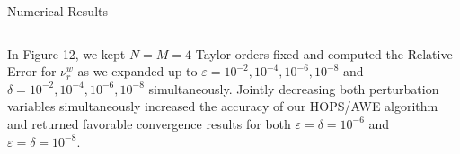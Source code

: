 \begin{section}{Numerical Results}
\begin{longtable}[c]{llllll}
\end{longtable}
\vspace{-2mm}
\hspace{-6mm}In Figure 12, we kept  $N=M=4$ Taylor orders fixed and computed the Relative Error for $\nu^w_r$ as we expanded up to $\varepsilon= 10^{-2},10^{-4},10^{-6},10^{-8}$ and $\delta = 10^{-2},10^{-4},10^{-6},10^{-8}$ simultaneously. Jointly decreasing both perturbation variables simultaneously increased the accuracy of our HOPS/AWE algorithm and returned favorable convergence results for both $\varepsilon = \delta = 10^{-6}$ and $\varepsilon = \delta = 10^{-8}$.

\begin{figure}[H]
\centering
    \\

\end{figure}
\end{section}
